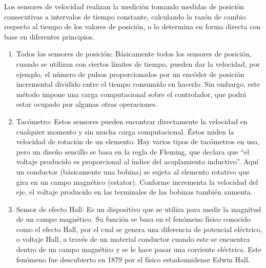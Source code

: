 \begin{enumerate}
            Los sensores de velocidad realizan la medición tomando medidas de posición consecutivas a intervalos de tiempo constante, calculando la razón de cambio respecto al tiempo de los valores de posición, o lo determina en forma directa con base en diferentes principios.\cite{saha2010robotics}\\
           
			
			\begin{enumerate}
				\item Todos los sensores de posición:
				Básicamente todos los sensores de posición, cuando se utilizan con ciertos límites de tiempo, pueden dar la velocidad, por ejemplo, el número de pulsos proporcionados por un encóder de posición incremental dividido entre el tiempo consumido en hacerlo. Sin embargo, este método impone una carga computacional sobre el controlador, que podrá estar ocupado por algunas otras operaciones.\\
		
		\begin{figure}[!ht]
			\centering
			\hfill
		\end{figure}
				
				\item Tacómetro: Estos sensores pueden encontrar directamente la velocidad en cualquier momento y sin mucha carga computacional. Éstos miden la velocidad de rotación de un elemento. Hay varios tipos de tacómetros en uso, pero un diseño sencillo se basa en la regla de Fleming, que declara que “el voltaje producido es proporcional al índice del acoplamiento inductivo”. Aquí un conductor (básicamente una bobina) se sujeta al elemento rotativo que gira en un campo magnético (estator). Conforme incrementa la velocidad del eje, el voltaje producido en las terminales de las bobinas también aumenta.\cite{saha2010robotics}\\
				
				\begin{figure}[h]
					\centering
					\hfill
				\end{figure}
				
				\item Sensor de efecto Hall: Es un dispositivo que se utiliza para medir la magnitud de un campo magnético. Su función se basa en el fenómeno físico conocido como el efecto Hall, por el cual se genera una diferencia de potencial eléctrico, o voltaje Hall, a través de un material conductor cuando este se encuentra dentro de un campo magnético y se le hace pasar una corriente eléctrica. Este fenómeno fue descubierto en 1879 por el físico estadounidense Edwin Hall.\cite{Hall} \\
				

\end{enumerate}
\end{enumerate}
